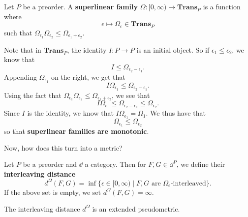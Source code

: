 \begin{definition}
    Let $P$ be a preorder. A \textbf{superlinear family} $\Omega: [0, \infty) \to \textbf{Trans}_P$ 
    is a function where 
    \[
        \epsilon \mapsto \Omega_\epsilon \in \textbf{Trans}_P  
    \]
    such that $\Omega_{\epsilon_1}\Omega_{\epsilon_2} \le \Omega_{\epsilon_1 + \epsilon_2}$. 
\end{definition}

    Note that in $\textbf{Trans}_P$, the identity $I: P \to P$ is an initial object. 
    So if $\epsilon_1 \le \epsilon_2$, we know that 
    \[
        I \le \Omega_{\epsilon_2 - \epsilon_1}.   
    \]
    Appending $\Omega_{\epsilon_1}$ on the right, we get that 
    \[
        I\Omega_{\epsilon_1} \le \Omega_{\epsilon_2 - \epsilon_1}.
    \]
    Using the fact that $\Omega_{\epsilon_1}\Omega_{\epsilon_2} \le \Omega_{\epsilon_1 + \epsilon_2}$, 
    we see that 
    \[
        I\Omega_{\epsilon_1} \le \Omega_{\epsilon_2 - \epsilon_1} \le \Omega_{\epsilon_2}.
    \]
    Since $I$ is the identity, we know that $I\Omega_{\epsilon_1} = \Omega_1$. We thus have that 
    \[
        \Omega_{\epsilon_1} \le \Omega_{\epsilon_2}
    \]
    so that \textbf{superlinear families are monotonic}.

    Now, how does this turn into a metric? 

\begin{definition}
    Let $P$ be a preorder and $\dd$ a category. Then for $F,G \in \dd^P$, 
    we define their \textbf{interleaving distance} 
    \[
        d^{\Omega}(F,G)
        = \inf \{ \epsilon \in [0, \infty) \mid F, G \text{ are } \Omega_\epsilon\text{-interleaved} \}.
    \]
    If the above set is empty, we set $d^{\Omega}(F,G) = \infty$. 
\end{definition}

\begin{thm}
    The interleaving distance $d^{\Omega}$ is an extended pseudometric.
\end{thm}

